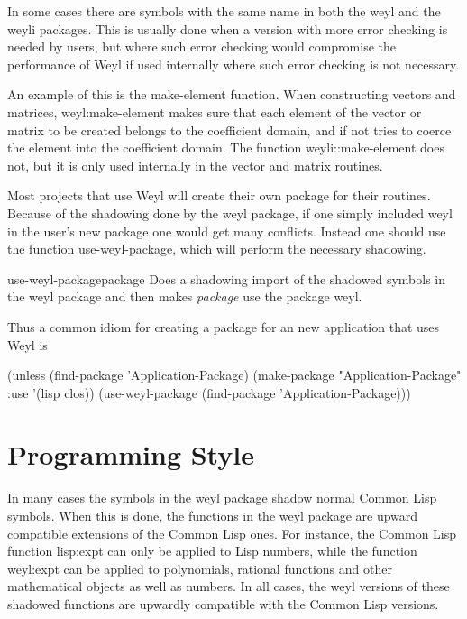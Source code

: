 In some cases there are symbols with the same name in both the {\sf
weyl} and the {\sf weyli} packages.  This is usually done when a
version with more error checking is needed by users, but where such
error checking would compromise the performance of Weyl if used
internally where such error checking is not necessary.

An example of this is the {\sf make-element} function.  When
constructing vectors and matrices, {\sf weyl:make-element} makes sure
that each element of the vector or matrix to be created belongs to
the coefficient domain, and if not tries to coerce the element into
the coefficient domain.  The function {\sf weyli::make-element} does
not, but it is only used internally in the vector and matrix routines.

Most projects that use Weyl will create their own package for their
routines.  Because of the shadowing done by the {\sf weyl} package, if
one simply included {\sf weyl} in the user's new package one would
get many conflicts.  Instead one should use the function {\sf
use-weyl-package}, which will perform the necessary shadowing.

\begin{functiondef}{use-weyl-package}{package}
Does a shadowing import of the shadowed symbols in the {\sf weyl}
package and then makes {\em package} use the package {\sf weyl}.
\end{functiondef}

Thus a common idiom for creating a package for an new application that
uses Weyl is 
\begin{code}
(unless (find-package 'Application-Package)
  (make-package "Application-Package" :use '(lisp clos))
  (use-weyl-package (find-package 'Application-Package)))
\end{code}

\section{Programming Style}
\label{Weyl:Style:Sec}

In many cases the symbols in the {\sf weyl} package shadow normal
Common Lisp symbols.  When this is done, the functions in the {\sf
weyl} package are upward compatible extensions of the Common Lisp
ones.  For instance, the Common Lisp function {\sf lisp:expt} can
only be applied to Lisp numbers, while the function {\sf weyl:expt}
can be applied to polynomials, rational functions and other
mathematical objects as well as numbers.  In all cases, the {\sf weyl}
versions of these shadowed functions are upwardly compatible with the
Common Lisp versions.


